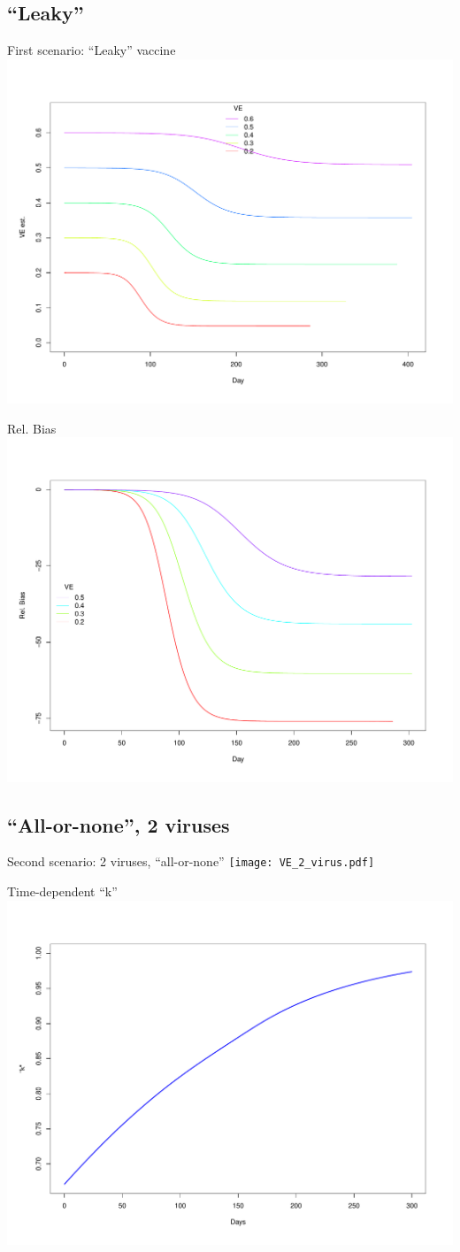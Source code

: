 \documentclass{beamer}
\begin{document}
\subsection{``Leaky''}
\begin{frame}{First scenario: ``Leaky'' vaccine}
\centering
\includegraphics[width=.7\textwidth]{VEtime.pdf}
\end{frame}
%
%
\begin{frame}{Rel. Bias}
\includegraphics[width=.7\textwidth]{VEbias_rel.pdf}
\end{frame}
%
%
\subsection{``All-or-none'', 2 viruses}
\begin{frame}{Second scenario: 2 viruses, ``all-or-none''}
\centering
		\texttt{[image: VE\_2\_virus.pdf]}
\end{frame}
%
\begin{frame}{Time-dependent ``k''}
\centering
\includegraphics[width=.7\textwidth]{k_time.pdf}
\end{frame}
\end{document}
